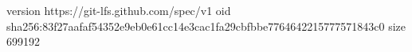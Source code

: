 version https://git-lfs.github.com/spec/v1
oid sha256:83f27aafaf54352e9eb0e61cc14e3cac1fa29cbfbbe7764642215777571843c0
size 699192
